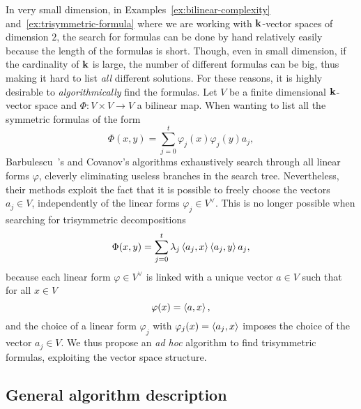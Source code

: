 In very small dimension, \eg in Examples~\ref{ex:bilinear-complexity}
and~\ref{ex:trisymmetric-formula} where we are working with $\mathbf{k}$-vector spaces
of dimension $2$, the search for formulas can be done by hand relatively easily
because the length of the formulas is short. Though, even in small dimension, if
the cardinality of $\mathbf{k}$ is large, the number of different formulas can be
big, thus making it hard to list \emph{all} different solutions. For these
reasons, it is highly desirable to \emph{algorithmically} find the formulas.
Let $V$ be a finite dimensional $\mathbf{k}$-vector space and $\Phi:V\times V\to V$ a bilinear map.
When wanting to list all the symmetric formulas of the form
\[
  \Phi(x, y) = \sum_{j=0}^t\varphi_j(x)\varphi_j(y)a_j,
\]
Barbulescu~\etal\!\!\!'s and Covanov's algorithms exhaustively search through
all linear forms $\varphi$, cleverly eliminating useless branches in the search
tree. Nevertheless, their methods exploit the fact that it is possible to freely
choose the vectors $a_j\in V$, independently of the linear forms $\varphi_j\in
V^\vee$. This is
no longer possible when searching for trisymmetric decompositions
\[
  \Phi(x, y) = \sum_{j=0}^t\lambda_j\left\langle a_j,x\right\rangle\left\langle a_j,y\right\rangle a_j,
\]
because each
linear form $\varphi\in V^\vee$ is linked with a unique vector $a\in V$ such
that for all $x\in V$
\[
  \varphi(x) = \left\langle a,x\right\rangle,
\]
and the choice of a linear form $\varphi_j$ with $\varphi_j(x)=\left\langle a_j,x\right\rangle$
imposes the choice of the vector $a_j\in V$. We thus propose an \emph{ad hoc}
algorithm to find trisymmetric formulas, exploiting the vector space structure.

\subsection{General algorithm description}
\label{sec:general-algorithm}

